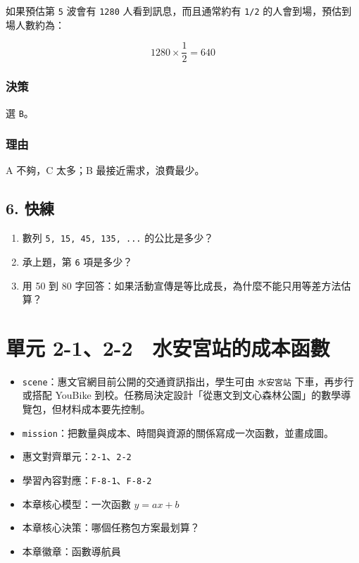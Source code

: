 \documentclass[
  chinese,
  12pt,
  a4paper,
  oneside]{article}
\providecommand{\tightlist}{%
  \setlength{\itemsep}{0pt}\setlength{\parskip}{0pt}}
\begin{document}
如果預估第 \texttt{5} 波會有 \texttt{1280} 人看到訊息，而且通常約有
\texttt{1/2} 的人會到場，預估到場人數約為：

\[
1280 \times \frac{1}{2} = 640
\]

\subsubsection{決策}\label{ux6c7aux7b56-1}

選 \texttt{B}。

\subsubsection{理由}\label{ux7406ux7531}

A 不夠，C 太多；B 最接近需求，浪費最少。

\subsection{6. 快練}\label{ux5febux7df4}

\begin{enumerate}
\def\labelenumi{\arabic{enumi}.}
\tightlist
\item
  數列 \texttt{5,\ 15,\ 45,\ 135,\ ...} 的公比是多少？
\item
  承上題，第 \texttt{6} 項是多少？
\item
  用 50 到 80
  字回答：如果活動宣傳是等比成長，為什麼不能只用等差方法估算？
\end{enumerate}

\newpage

\section{單元
2-1、2-2　水安宮站的成本函數}\label{ux55aeux5143-2-12-2-ux6c34ux5b89ux5baeux7ad9ux7684ux6210ux672cux51fdux6578}

\begin{itemize}
\tightlist
\item
  \texttt{scene}：惠文官網目前公開的交通資訊指出，學生可由
  \texttt{水安宮站} 下車，再步行或搭配 YouBike
  到校。任務局決定設計「從惠文到文心森林公園」的數學導覽包，但材料成本要先控制。
\item
  \texttt{mission}：把數量與成本、時間與資源的關係寫成一次函數，並畫成圖。
\item
  惠文對齊單元：\texttt{2-1}、\texttt{2-2}
\item
  學習內容對應：\texttt{F-8-1}、\texttt{F-8-2}
\item
  本章核心模型：一次函數 \(y = ax + b\)
\item
  本章核心決策：哪個任務包方案最划算？
\item
  本章徽章：函數導航員
\end{itemize}
\end{document}
